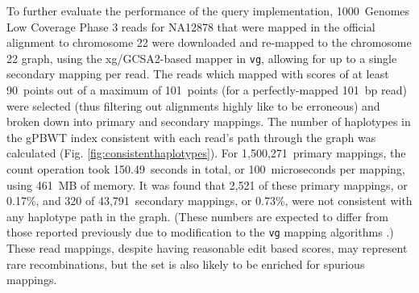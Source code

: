 To further evaluate the performance of the query implementation, 1000~Genomes Low Coverage Phase 3 reads for NA12878 that were mapped in the official alignment to chromosome 22 were downloaded and re-mapped to the chromosome 22 graph, using the xg/GCSA2-based mapper in \texttt{vg}, allowing for up to a single secondary mapping per read. The reads which mapped with scores of at least 90~points out of a maximum of 101~points (for a perfectly-mapped 101~bp read) were selected (thus filtering out alignments highly like to be erroneous) and broken down into primary and secondary mappings. The number of haplotypes in the gPBWT index consistent with each read's path through the graph was calculated (Fig. \ref{fig:consistenthaplotypes}). For 1,500,271~primary mappings, the count operation took 150.49~seconds in total, or 100~microseconds per mapping, using 461~MB of memory. It was found that 2,521 of these primary mappings, or 0.17\%, and 320 of 43,791~secondary mappings, or 0.73\%, were not consistent with any haplotype path in the graph. (These numbers are expected to differ from those reported previously due to modification to the \texttt{vg} mapping algorithms  \cite{novak2016graph}.) These read mappings, despite having reasonable edit based scores, may represent rare recombinations, but the set is also likely to be enriched for spurious mappings.


